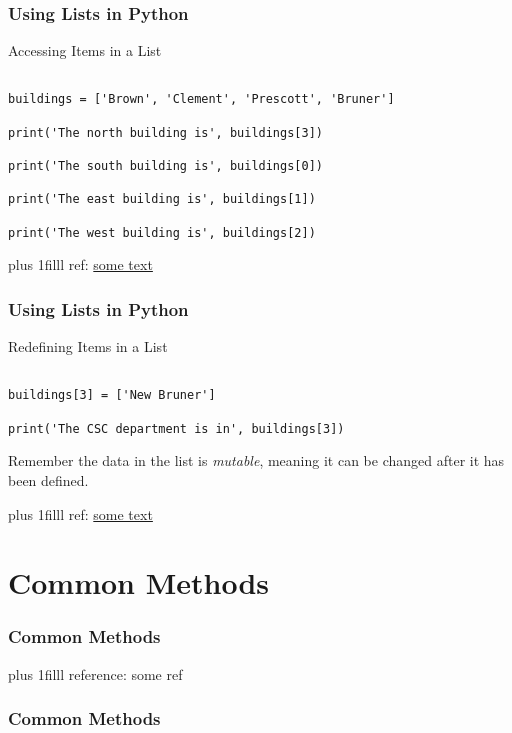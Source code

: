 \documentclass[fleqn]{beamer} %
\newcommand{\sectiontitleII}{Using Lists in Python}
\newcommand{\sectiontitleIII}{Common Methods}
\newcommand{\btVFill}{\vskip0pt plus 1filll}
\begin{document}
	\begin{frame}[containsverbatim] \small
		\frametitle{\sectiontitleII}
		
		Accessing Items in a List	

		\begin{lstlisting}

buildings = ['Brown', 'Clement', 'Prescott', 'Bruner']

print('The north building is', buildings[3])

print('The south building is', buildings[0])

print('The east building is', buildings[1])

print('The west building is', buildings[2])
		\end{lstlisting}

		\btVFill
		\tiny{ref: \href{some link}{some text}}
	\end{frame}	

	\begin{frame}[containsverbatim] \small
		\frametitle{\sectiontitleII}
		
		Redefining Items in a List	

		\begin{lstlisting}

buildings[3] = ['New Bruner']

print('The CSC department is in', buildings[3])

		\end{lstlisting}


		\vspace*{10mm}
		Remember the data in the list is {\it mutable}, meaning it can be changed after it has been defined.
	

		\btVFill
		\tiny{ref: \href{some link}{some text}}
	\end{frame}	


\section{\sectiontitleIII}

	\begin{frame}[label=sectionIII] \small
		\frametitle{\sectiontitleIII}
		

		\btVFill
		\tiny{reference: some ref }

	\end{frame}

	\begin{frame} \small
		\frametitle{\sectiontitleIII}
		
		
		
	\end{frame}
\end{document}
